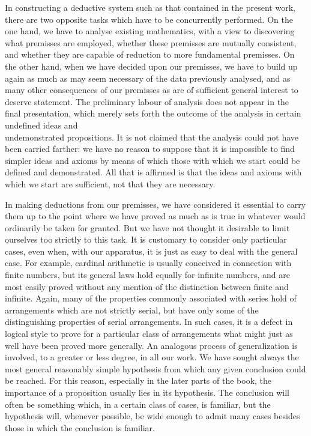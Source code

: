 \documentclass[10pt]{article}
\begin{document}
In constructing a deductive system such as that contained in the present work, there are two opposite tasks which have to be concurrently performed. On the one hand, we have to analyse existing mathematics, with a view to discovering what premisses are employed, whether these premisses are mutually consistent, and whether they are capable of reduction to more fundamental premisses. On the other hand, when we have decided upon our premisses, we have to build up again as much as may seem necessary of the data previously analysed, and as many other consequences of our premisses as are of sufficient general interest to deserve statement. The preliminary labour of analysis does not appear in the final presentation, which merely sets forth the outcome of the analysis in certain undefined ideas and\\
undemonstrated propositions. It is not claimed that the analysis could not have been carried farther: we have no reason to suppose that it is impossible to find simpler ideas and axioms by means of which those with which we start could be defined and demonstrated. All that is affirmed is that the ideas and axioms with which we start are sufficient, not that they are necessary.

In making deductions from our premisses, we have considered it essential to carry them up to the point where we have proved as much as is true in whatever would ordinarily be taken for granted. But we have not thought it desirable to limit ourselves too strictly to this task. It is customary to consider only particular cases, even when, with our apparatus, it is just as easy to deal with the general case. For example, cardinal arithmetic is usually conceived in connection with finite numbers, but its general laws hold equally for infinite numbers, and are most easily proved without any mention of the distinction between finite and infinite. Again, many of the properties commonly associated with series hold of arrangements which are not strictly serial, but have only some of the distinguishing properties of serial arrangements. In such cases, it is a defect in logical style to prove for a particular class of arrangements what might just as well have been proved more generally. An analogous process of generalization is involved, to a greater or less degree, in all our work. We have sought always the most general reasonably simple hypothesis from which any given conclusion could be reached. For this reason, especially in the later parts of the book, the importance of a proposition usually lies in its hypothesis. The conclusion will often be something which, in a certain class of cases, is familiar, but the hypothesis will, whenever possible, be wide enough to admit many cases besides those in which the conclusion is familiar.
\end{document}
